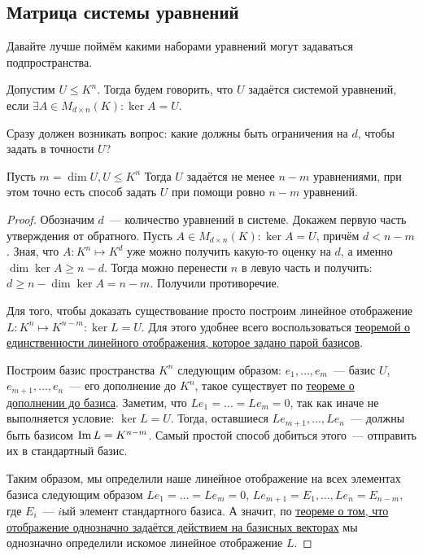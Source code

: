 \subsection{Матрица системы уравнений}
\begin{motivation}
    Давайте лучше поймём какими наборами уравнений могут задаваться подпространства.
\end{motivation}
\begin{definition}
    Допустим $U\leq K^n$. Тогда будем говорить, что $U$ задаётся системой уравнений, если
    $\exists A \in M_{d\times n}(K)\colon \ker A = U$.
\end{definition}
\begin{remark}
    Сразу должен возникать вопрос: какие должны быть ограничения на $d$, чтобы задать в точности $U$?
\end{remark}
\begin{statement}
    Пусть $m = \dim U, U\leq K^n$ Тогда $U$ задаётся не менее $n - m$ уравнениями, при этом
    точно есть способ задать $U$ при помощи ровно $n - m$ уравнений.
\end{statement}
\begin{proof}
    Обозначим $d$~--- количество уравнений в системе. Докажем первую часть утверждения от обратного. 
    Пусть $A\in M_{d\times n}(K)\colon \ker A = U$, причём $d < n - m$.
    Зная, что $A\colon K^n\mapsto K^d$ уже можно получить какую-то оценку на $d$, 
    а именно $\dim \ker A \geq n - d$. Тогда можно перенести $n$ в левую часть и получить:
    $d \geq n - \dim \ker A =  n - m$. Получили противоречие.

    Для того, чтобы доказать существование просто построим линейное отображение $L: K^n\mapsto K^{n-m}\colon
    \ker L = U$. Для этого удобнее всего воспользоваться 
    \hyperref[thm:Линейное отображение определяется действием на базисных векторах]{теоремой о единственности линейного
    отображения, которое задано парой базисов}.

    Построим базис пространства $K^n$ следующим образом:  $e_1,\dots,e_m$~--- базис $U$,
    $e_{m + 1},\dots, e_n$~--- его дополнение до $K^n$, такое существует по 
    \hyperref[thm:О дополнении до базиса]{теореме о дополнении до базиса}.
    Заметим, что $Le_1 = \dots = Le_m = 0$, так как иначе не выполняется условие: $\ker L = U$. 
    Тогда, оставшиеся $Le_{m + 1},\dots, Le_n$~--- должны быть базисом $\operatorname{Im} L = K^{n - m}$.
    Самый простой способ добиться этого~--- отправить их в стандартный базис.
    
    Таким образом, мы определили наше линейное отображение на всех элементах базиса
    следующим образом $Le_1 = \dots = Le_m = 0$, $Le_{m + 1} = E_1, \dots, Le_n = E_{n - m}$,
    где $E_i$~--- $i$ый элемент стандартного базиса. А значит, по 
    \hyperref[thm:Линейное отображение определяется действием на базисных векторах]
    {теореме о том, что отображение однозначно задаётся действием на базисных векторах}
    мы однозначно определили искомое линейное отображение $L$.
\end{proof}
